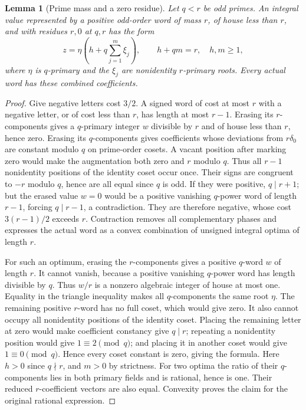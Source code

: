 \documentclass[11pt,a4paper]{article}
\numberwithin{equation}{section}
\newtheorem{lemma}[theorem]{Lemma}
\begin{document}
\begin{lemma}[Prime mass and a zero residue]\label{word:prime-mass}
Let $q<r$ be odd primes. An integral value represented by a positive
odd-order word of mass $r$, of house less than $r$, and with
residues $r,0$ at $q,r$ has the form
\[
 z=\eta\left(h+q\sum_{j=1}^m\xi_j\right),
 \qquad h+qm=r,\quad h,m\ge1,
\]
where $\eta$ is $q$-primary and the $\xi_j$ are nonidentity
$r$-primary roots. Every actual word has these combined coefficients.
\end{lemma}
\begin{proof}
Give negative letters cost $3/2$. A signed word of cost at most
$r$ with a negative letter, or of cost less than $r$, has length
at most $r-1$. Erasing its $r$-components gives a $q$-primary
integer $w$ divisible by $r$ and of house less than $r$, hence zero.
Erasing its $q$-components gives coefficients whose deviations
from $r\delta_0$ are constant modulo $q$ on prime-order cosets.
A vacant position after marking zero would make the augmentation
both zero and $r$ modulo $q$. Thus all $r-1$ nonidentity
positions of the identity coset occur once. Their signs are
congruent to $-r$ modulo $q$, hence are all equal since $q$ is odd.
If they were positive, $q\mid r+1$; but the erased value $w=0$
would be a positive vanishing $q$-power word of length $r-1$,
forcing $q\mid r-1$, a contradiction. They are therefore negative,
whose cost $3(r-1)/2$ exceeds $r$. Contraction removes
all complementary phases and expresses the actual word as a
convex combination of unsigned integral optima of length $r$.

For such an optimum, erasing the $r$-components gives a positive
$q$-word $w$ of length $r$. It cannot vanish, because a positive
vanishing $q$-power word has length divisible by $q$. Thus $w/r$
is a nonzero algebraic integer of house at most one. Equality
in the triangle inequality makes all $q$-components the same
root $\eta$.
The remaining positive $r$-word has no full coset, which would
give zero. It also cannot occupy all nonidentity positions of
the identity coset. Placing the remaining letter at zero would
make coefficient constancy give $q\mid r$; repeating a nonidentity
position would give $1\equiv2\pmod q$; and placing it in another
coset would give $1\equiv0\pmod q$.
Hence every coset constant is zero, giving the formula.
Here $h>0$ since $q\nmid r$, and $m>0$ by strictness.
For two optima the ratio of their $q$-components lies in both
primary fields and is rational, hence is one. Their reduced
$r$-coefficient vectors are also equal. Convexity proves the
claim for the original rational expression.
\end{proof}
\end{document}
